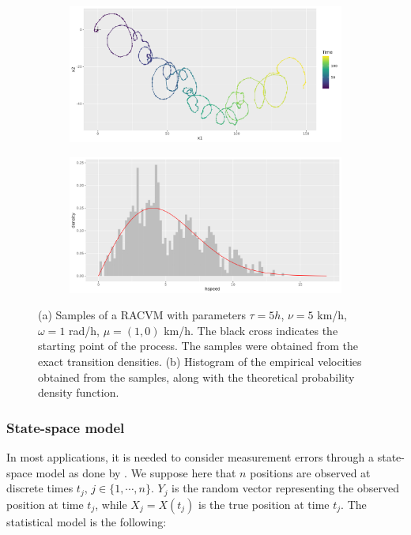 \documentclass[11pt]{article}
\newcommand {\1}{\mathbb{1}}
\begin{document}

\begin{figure}[H]
	\centering
	\begin{subfigure}{0.48\textwidth}
		\centering
		\includegraphics[scale=0.3]{images/rcvm/tau5_nu5_omega1mu11_sigmaobs0.03 .png}
		\caption{}
	\end{subfigure}
	\begin{subfigure}{0.48\textwidth}
		\centering
		\includegraphics[scale=0.3]{images/rcvm/hspeed_histo_tau5_nu5omega1_mu11_sigmaobs0.03 .png}
		\caption{}
	\end{subfigure}
	\caption{(a) Samples of a RACVM with parameters $\tau=5 h$, $\nu=5$ km/h,$\omega=1$ rad/h, $\mu=(1,0)$ km/h. The black cross indicates the starting point of the process. The samples were obtained from the exact transition densities. (b) Histogram of the empirical velocities obtained from the samples, along with the theoretical probability density function.}
	\label{fig: sample RACVM}
\end{figure}


\subsubsection{State-space model}
\label{section: state space model}
In most applications, it is needed to consider measurement errors through a state-space model as done by \cite{johnson_continuoustime_2008}. We suppose here that $n$ positions are observed at discrete times $t_j$, $j \in \{1,\cdots, n\}$. $Y_j$ is the random vector representing the observed position at time $t_j$, while $X_j=X(t_j)$ is the true position at time $t_j$. The statistical model is the following:
\end{document}
